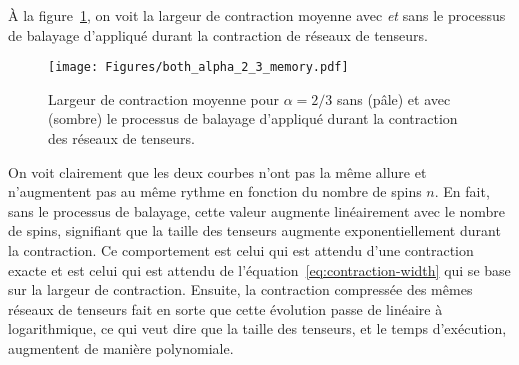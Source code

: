 À la figure~\ref{fig:alpha066_both_memory_curves}, on voit la largeur de contraction moyenne avec \emph{et} sans le processus de balayage d'appliqué durant la contraction de réseaux de tenseurs.
\begin{figure}[ht]
    \centering
    \texttt{[image: Figures/both\_alpha\_2\_3\_memory.pdf]}
    \caption[Largeur de contraction moyenne pour $\alpha = 2/3$ sans et avec le processus de balayage d'appliqué durant la contraction des réseaux de tenseurs.]{Largeur de contraction moyenne pour $\alpha = 2/3$ sans (pâle) et avec (sombre) le processus de balayage d'appliqué durant la contraction des réseaux de tenseurs.}
    \label{fig:alpha066_both_memory_curves}
\end{figure}
On voit clairement que les deux courbes n'ont pas la même allure et n'augmentent pas au même rythme en fonction du nombre de spins $n$.
En fait, sans le processus de balayage, cette valeur augmente linéairement avec le nombre de spins, signifiant que la taille des tenseurs augmente exponentiellement durant la contraction.
Ce comportement est celui qui est attendu d'une contraction exacte et est celui qui est attendu de l'équation~\ref{eq:contraction-width} qui se base sur la largeur de contraction.
Ensuite, la contraction compressée des mêmes réseaux de tenseurs fait en sorte que cette évolution passe de linéaire à logarithmique, ce qui veut dire que la taille des tenseurs, et le temps d'exécution, augmentent de manière polynomiale.

